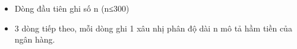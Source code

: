 \begin{itemize}
	\item     Dòng đầu tiên ghi số n (n≤300)   
	\item     3 dòng tiếp theo, mỗi dòng ghi 1 xâu nhị phân độ dài n mô tả hầm tiền của ngân hàng.   
\end{itemize}

\